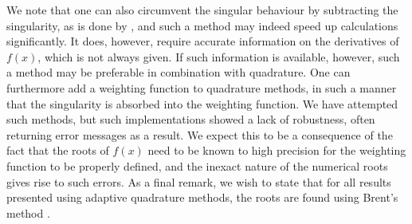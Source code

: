 We note that one can also circumvent the singular behaviour by subtracting the singularity, as is done by \citet{velasco2020knosos}, and such a method may indeed speed up calculations significantly. It does, however, require accurate information on the derivatives of $f(x)$, which is not always given. If such information is available, however, such a method may be preferable in combination with quadrature. One can furthermore add a weighting function to quadrature methods, in such a manner that the singularity is absorbed into the weighting function. We have attempted such methods, but such implementations showed a lack of robustness, often returning error messages as a result. We expect this to be a consequence of the fact that the roots of $f(x)$ need to be known to high precision for the weighting function to be properly defined, and the inexact nature of the numerical roots gives rise to such errors. As a final remark, we wish to state that for all results presented using adaptive quadrature methods, the roots are found using Brent's method \cite{brent2013algorithms}.

